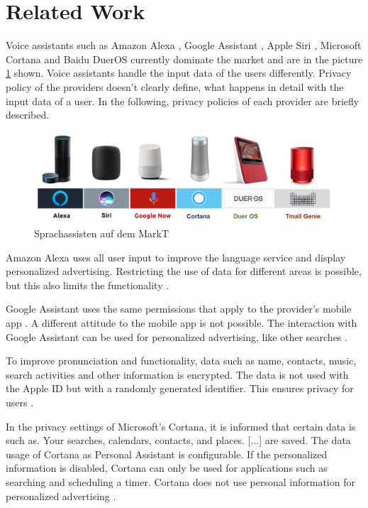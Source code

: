\section{Related Work}
Voice assistants such as Amazon Alexa \cite{alexaAssitant}, Google Assistant \cite{googleAssistant}, Apple Siri \cite{siriAssistant}, Microsoft Cortana \cite{cortanaAssistant} and Baidu DuerOS \cite{baiduAssistant} currently dominate the market and are in the picture \ref{fig:sprachassistenten} shown. Voice assistants handle the input data of the users differently. Privacy policy of the providers doesn't clearly define, what happens in detail with the input data of a user. In the following, privacy policies of each provider are briefly described.

\begin{figure}[h!]
	\centering
	\includegraphics[width=1\linewidth]{Picture/Sprachassistenten}
	\caption[Sprachassisten auf dem MarkT]{Sprachassisten auf dem MarkT}
	\label{fig:sprachassistenten}
\end{figure}

Amazon Alexa uses all user input to improve the language service and display personalized advertising. Restricting the use of data for different areas is possible, but this also limits the functionality \cite{alexaPrivacy}.

Google Assistant uses the same permissions that apply to the provider's mobile app \cite{googleShare}. A different attitude to the mobile app is not possible. The interaction with Google Assistant can be used for personalized advertising, like other searches \cite{googlePrivacy}.

To improve pronunciation and functionality, data such as name, contacts, music, search activities and other information is encrypted. The data is not used with the Apple ID but with a randomly generated identifier. This ensures privacy for users \cite{siriPrivacy}.

In the privacy settings of Microsoft's Cortana, it is informed that certain data is \glqq [...] such as. Your searches, calendars, contacts, and places. [...]\grqq{} are saved. The data usage of Cortana as Personal Assistant is configurable. If the personalized information is disabled, Cortana can only be used for applications such as searching and scheduling a timer. Cortana does not use personal information for personalized advertising \cite{cortanaAssistant}.

